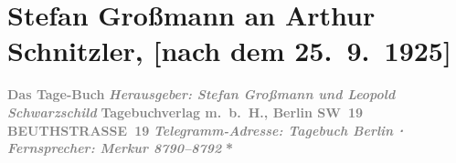 

         
         \renewcommand{\erwaehntePersonen}{Personen: Stefan Großmann, Leopold Schwarzschild}
         \renewcommand{\erwaehnteInstitutionen}{Institutionen: Das Tage-Buch}
         \renewcommand{\erwaehnteOrte}{Orte: Berlin, Beuthstrasse, Sternwartestraße, Wien, XVIII., Währing}
         \renewcommand{\erwaehnteWerke}{Werke: Bemerkungen, Das Tage-Buch}
               \section[Stefan Großmann an Arthur Schnitzler, {[}nach dem 25. 9. 1925{]}]{ Stefan Großmann an Arthur Schnitzler, {[}nach dem 25. 9. 1925{]}}\nopagebreak{}\rehead{ }\begin{ledgroupsized}[t]{13cm}\normalsize\beginnumbering{} \toendnotes[C]{\smallbreak\pagebreak[2]} 
\toendnotes[C]{\smallbreak}\pstart
           \noindent{}\centering{}{\pb}\textcolor{gray}{\textbf{Das Tage-Buch}}\pend
           \pstart
           \noindent{}\centering{}\textcolor{gray}{\textbf{\emph{Herausgeber: Stefan Großmann und Leopold Schwarzschild}}}\pend
           \pstart
           \noindent{}\centering{}\textcolor{gray}{\textbf{Tagebuchverlag m. b. H., Berlin SW 19}}\pend
           \pstart
           \noindent{}\centering{}\textcolor{gray}{\textbf{BEUTHSTRASSE 19}}\pend
           \pstart
           \noindent{}\centering{}\textcolor{gray}{\textbf{\emph{Telegramm-Adresse: Tagebuch Berlin ⋅ Fernsprecher: Merkur 8790–8792}}}\pend
           \pstart
           \noindent{}\centering{}\textcolor{gray}{\textbf{\emph{}}}\pend
           \pstart
           \noindent{}\centering{}\textcolor{gray}{\textbf{*}}\pend

\end{ledgroupsized}
